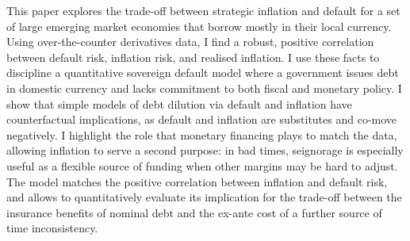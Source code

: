 This paper explores the trade-off between strategic inflation and default for a set of large emerging market economies that borrow mostly in their local currency. Using over-the-counter derivatives data, I find a robust, positive correlation between default risk, inflation risk, and realised inflation. I use these facts to discipline a quantitative sovereign default model where a government issues debt in domestic currency and lacks commitment to both fiscal and monetary policy. I show that simple models of debt dilution via default and inflation have counterfactual implications, as default and inflation are substitutes and co-move negatively. I highlight the role that monetary financing plays to match the data, allowing inflation to serve a second purpose: in bad times, seignorage is especially useful as a flexible source of funding when other margins may be hard to adjust. The model matches the positive correlation between inflation and default risk, and allows to quantitatively evaluate its implication for the trade-off between the insurance benefits of nominal debt and the ex-ante cost of a further source of time inconsistency.   